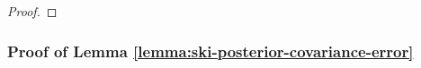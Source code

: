 \begin{proof}

\end{proof}

\subsubsection{Proof of Lemma \ref{lemma:ski-posterior-covariance-error}}\label{sec:proof-ski-posterior-covariance-error}


